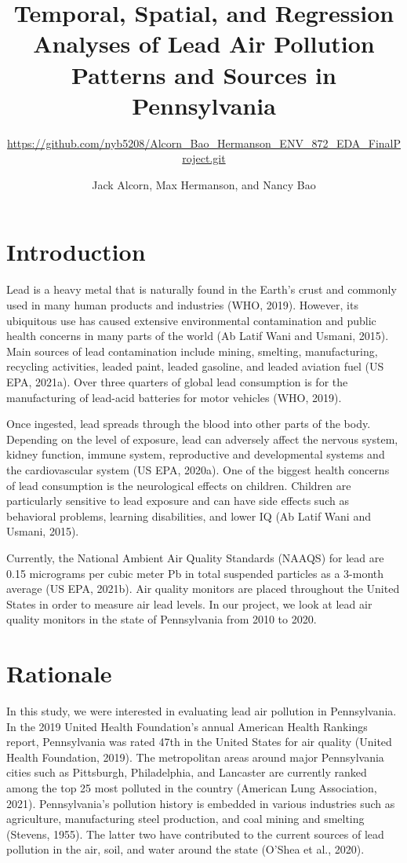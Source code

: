 \documentclass[
  12pt,
]{article}
\title{Temporal, Spatial, and Regression Analyses of Lead Air Pollution
Patterns and Sources in Pennsylvania}
\subtitle{\url{https://github.com/nyb5208/Alcorn_Bao_Hermanson_ENV_872_EDA_FinalProject.git}}
\author{Jack Alcorn, Max Hermanson, and Nancy Bao}
\date{}
\begin{document}
\maketitle

\newpage
\tableofcontents 
\newpage
\listoftables
\newpage
\listoffigures 
\newpage

\hypertarget{introduction}{%
\section{Introduction}\label{introduction}}

Lead is a heavy metal that is naturally found in the Earth's crust and
commonly used in many human products and industries (WHO, 2019).
However, its ubiquitous use has caused extensive environmental
contamination and public health concerns in many parts of the world (Ab
Latif Wani and Usmani, 2015). Main sources of lead contamination include
mining, smelting, manufacturing, recycling activities, leaded paint,
leaded gasoline, and leaded aviation fuel (US EPA, 2021a). Over three
quarters of global lead consumption is for the manufacturing of
lead-acid batteries for motor vehicles (WHO, 2019).

Once ingested, lead spreads through the blood into other parts of the
body. Depending on the level of exposure, lead can adversely affect the
nervous system, kidney function, immune system, reproductive and
developmental systems and the cardiovascular system (US EPA, 2020a). One
of the biggest health concerns of lead consumption is the neurological
effects on children. Children are particularly sensitive to lead
exposure and can have side effects such as behavioral problems, learning
disabilities, and lower IQ (Ab Latif Wani and Usmani, 2015).

Currently, the National Ambient Air Quality Standards (NAAQS) for lead
are 0.15 micrograms per cubic meter Pb in total suspended particles as a
3-month average (US EPA, 2021b). Air quality monitors are placed
throughout the United States in order to measure air lead levels. In our
project, we look at lead air quality monitors in the state of
Pennsylvania from 2010 to 2020.

\hypertarget{rationale}{%
\section{Rationale}\label{rationale}}

In this study, we were interested in evaluating lead air pollution in
Pennsylvania. In the 2019 United Health Foundation's annual American
Health Rankings report, Pennsylvania was rated 47th in the United States
for air quality (United Health Foundation, 2019). The metropolitan areas
around major Pennsylvania cities such as Pittsburgh, Philadelphia, and
Lancaster are currently ranked among the top 25 most polluted in the
country (American Lung Association, 2021). Pennsylvania's pollution
history is embedded in various industries such as agriculture,
manufacturing steel production, and coal mining and smelting (Stevens,
1955). The latter two have contributed to the current sources of lead
pollution in the air, soil, and water around the state (O'Shea et al.,
2020).
\end{document}

